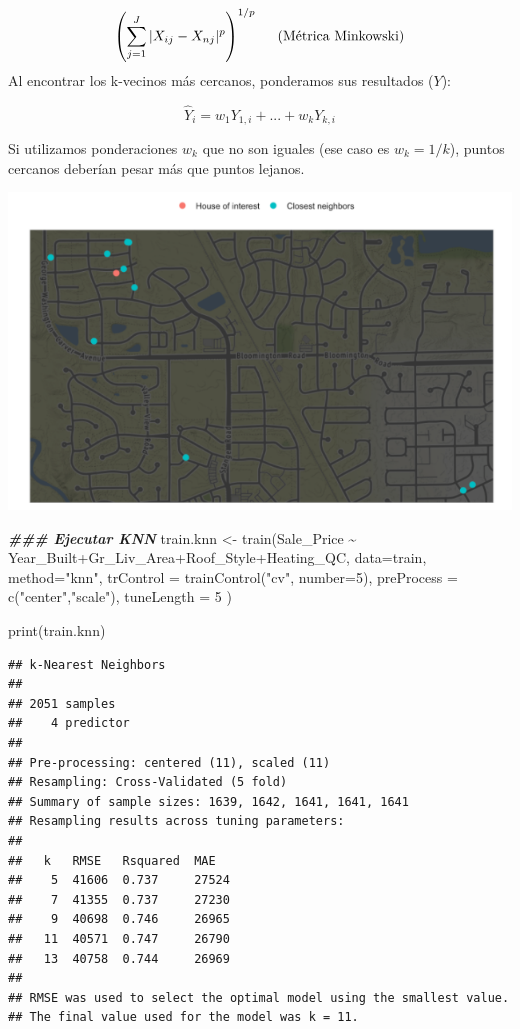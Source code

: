 \documentclass[
]{article}
\newenvironment{Shaded}{\begin{snugshade}}{\end{snugshade}}
\newcommand{\AttributeTok}[1]{\textcolor[rgb]{0.77,0.63,0.00}{#1}}
\newcommand{\DecValTok}[1]{\textcolor[rgb]{0.00,0.00,0.81}{#1}}
\newcommand{\DocumentationTok}[1]{\textcolor[rgb]{0.56,0.35,0.01}{\textbf{\textit{#1}}}}
\newcommand{\FunctionTok}[1]{\textcolor[rgb]{0.00,0.00,0.00}{#1}}
\newcommand{\NormalTok}[1]{#1}
\newcommand{\OtherTok}[1]{\textcolor[rgb]{0.56,0.35,0.01}{#1}}
\newcommand{\SpecialCharTok}[1]{\textcolor[rgb]{0.00,0.00,0.00}{#1}}
\newcommand{\StringTok}[1]{\textcolor[rgb]{0.31,0.60,0.02}{#1}}
\begin{document}
\[\left(\sum_{j=1}^J |X_{ij}-X_{nj}|^{p}\right)^{1/p} \hspace{.5 cm} \text{(Métrica Minkowski)}\]
Al encontrar los k-vecinos más cercanos, ponderamos sus resultados
(\(Y\)):

\[\hat{Y}_i=w_1Y_{1,i}+...+w_kY_{k,i}\]

Si utilizamos ponderaciones \(w_k\) que no son iguales (ese caso es
\(w_k=1/k\)), puntos cercanos deberían pesar más que puntos lejanos.

\includegraphics{4.png}

\begin{Shaded}
\begin{Highlighting}[]
\DocumentationTok{\#\#\# Ejecutar KNN}
\NormalTok{train.knn }\OtherTok{\textless{}{-}} \FunctionTok{train}\NormalTok{(Sale\_Price }\SpecialCharTok{\textasciitilde{}}\NormalTok{ Year\_Built}\SpecialCharTok{+}\NormalTok{Gr\_Liv\_Area}\SpecialCharTok{+}\NormalTok{Roof\_Style}\SpecialCharTok{+}\NormalTok{Heating\_QC, }
                   \AttributeTok{data=}\NormalTok{train, }\AttributeTok{method=}\StringTok{"knn"}\NormalTok{,  }
                   \AttributeTok{trControl =} \FunctionTok{trainControl}\NormalTok{(}\StringTok{"cv"}\NormalTok{, }\AttributeTok{number=}\DecValTok{5}\NormalTok{),}
                   \AttributeTok{preProcess =} \FunctionTok{c}\NormalTok{(}\StringTok{"center"}\NormalTok{,}\StringTok{"scale"}\NormalTok{),}
                   \AttributeTok{tuneLength =} \DecValTok{5} 
\NormalTok{)}

\FunctionTok{print}\NormalTok{(train.knn)}
\end{Highlighting}
\end{Shaded}

\begin{verbatim}
## k-Nearest Neighbors 
## 
## 2051 samples
##    4 predictor
## 
## Pre-processing: centered (11), scaled (11) 
## Resampling: Cross-Validated (5 fold) 
## Summary of sample sizes: 1639, 1642, 1641, 1641, 1641 
## Resampling results across tuning parameters:
## 
##   k   RMSE   Rsquared  MAE  
##    5  41606  0.737     27524
##    7  41355  0.737     27230
##    9  40698  0.746     26965
##   11  40571  0.747     26790
##   13  40758  0.744     26969
## 
## RMSE was used to select the optimal model using the smallest value.
## The final value used for the model was k = 11.
\end{verbatim}
\end{document}
